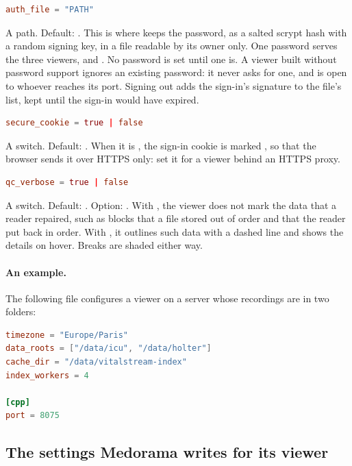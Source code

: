 \begin{lstlisting}[style=signature,language=TOML]
auth_file = "PATH"
\end{lstlisting}
A path. Default: . This is where
 keeps the password, as a salted scrypt hash with a random signing key, in a
file readable by its owner only. One password serves the three viewers,  and
. No password is set until one is. A viewer built without password support
ignores an existing password: it never asks for one, and is open to whoever reaches its port.
Signing out adds the sign-in's signature to the file's  list, kept until the
sign-in would have expired.

\begin{lstlisting}[style=signature,language=TOML]
secure_cookie = true | false
\end{lstlisting}
A switch. Default: . When it is , the sign-in cookie is marked
, so that the browser sends it over HTTPS only: set it for a viewer behind an HTTPS
proxy.

\begin{lstlisting}[style=signature,language=TOML]
qc_verbose = true | false
\end{lstlisting}
A switch. Default: . Option: . With , the viewer
does not mark the data that a reader repaired, such as blocks that a file stored out of order and
that the reader put back in order. With , it outlines such data with a dashed line and
shows the details on hover. Breaks are shaded either way.

\paragraph{An example.} The following file configures a viewer on a server whose recordings
are in two folders:
\begin{lstlisting}[language=TOML]
timezone = "Europe/Paris"
data_roots = ["/data/icu", "/data/holter"]
cache_dir = "/data/vitalstream-index"
index_workers = 4

[cpp]
port = 8075
\end{lstlisting}

\subsection{The settings Medorama writes for its viewer}
\label{sec:settings-reference-medorama-viewer}

